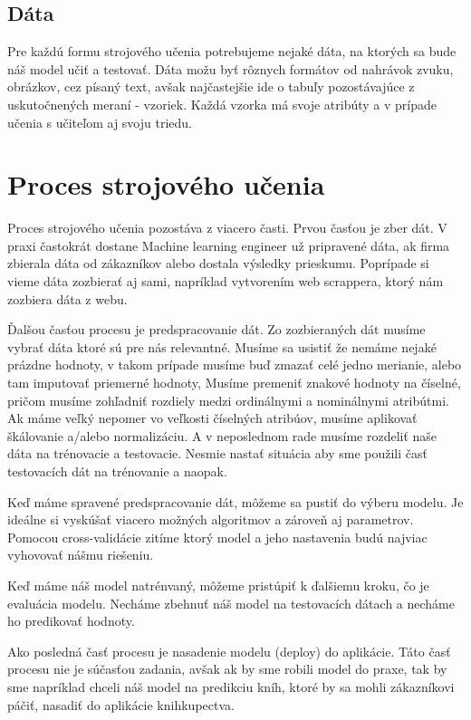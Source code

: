 \subsection{Dáta}
Pre každú formu strojového učenia potrebujeme nejaké dáta, na ktorých sa bude náš model učiť a testovať. Dáta možu byť rôznych formátov od nahrávok zvuku, obrázkov, cez písaný text, avšak najčastejšie ide o tabuľy pozostávajúce z uskutočnených meraní - vzoriek. Každá vzorka má svoje atribúty a v prípade učenia s učiteľom aj svoju triedu. 

\section{Proces strojového učenia}
Proces strojového učenia pozostáva z viacero časti. Prvou časťou je zber dát. V praxi častokrát dostane Machine learning engineer už pripravené dáta, ak firma zbierala dáta od zákazníkov alebo dostala výsledky prieskumu. Poprípade si vieme dáta zozbierať aj sami, napríklad vytvorením web scrappera, ktorý nám zozbiera dáta z webu.

Ďalšou časťou procesu je predspracovanie dát. Zo zozbieraných dát musíme vybrať dáta ktoré sú pre nás relevantné. Musíme sa usistiť že nemáme nejaké prázdne hodnoty, v takom prípade musíme buď zmazať celé jedno merianie, alebo tam imputovať priemerné hodnoty, Musíme premeniť znakové hodnoty na číselné, pričom musíme zohľadniť rozdiely medzi ordinálnymi a nominálnymi atribútmi. Ak máme veľký nepomer vo veľkosti číselných atribúov, musíme aplikovať škálovanie a/alebo normalizáciu. A v neposlednom rade musíme rozdeliť naše dáta na trénovacie a testovacie. Nesmie nastať situácia aby sme použili časť testovacích dát na trénovanie a naopak.

Keď máme spravené predspracovanie dát, môžeme sa pustiť do výberu modelu. Je ideálne si vyskúšať viacero možných algoritmov a zároveň aj parametrov. Pomocou cross-validácie zitíme ktorý model a jeho nastavenia budú najviac vyhovovať nášmu riešeniu. 

Keď máme náš model natrénvaný, môžeme pristúpiť k ďalšiemu kroku, čo je evaluácia modelu. Necháme zbehnuť náš model na testovacích dátach a necháme ho predikovať hodnoty. 

Ako posledná časť procesu je nasadenie modelu (deploy) do aplikácie. Táto časť procesu nie je súčasťou zadania, avšak ak by sme robili model do praxe, tak by sme napríklad chceli náš model na predikciu kníh, ktoré by sa mohli zákazníkovi páčiť, nasadiť do aplikácie knihkupectva.

